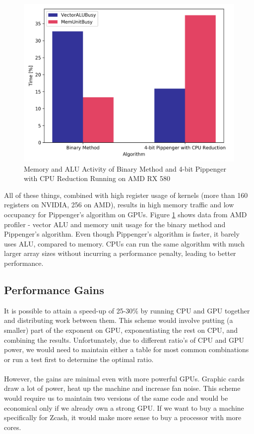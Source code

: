 \begin{figure}[h]
    \includegraphics[width=\linewidth]{Figures/profiler.png}
    \caption{Memory and ALU Activity of Binary Method and 4-bit Pippenger with CPU Reduction Running on AMD RX 580}
    \label{fig:profiler}
\end{figure}

\noindent All of these things, combined with high register usage of kernels (more than 160 registers on NVIDIA, 256 on AMD), results in high memory traffic and low occupancy for Pippenger's algorithm on GPUs. Figure \ref{fig:profiler} shows data from AMD profiler - vector ALU and memory unit usage for the binary method and Pippenger's algorithm. Even though Pippenger's algorithm is faster, it barely uses ALU, compared to memory. CPUs can run the same algorithm with much larger array sizes without incurring a performance penalty, leading to better performance.

\subsection{Performance Gains}

It is possible to attain a speed-up of 25-30\% by running CPU and GPU together and distributing work between them. This scheme would involve putting (a smaller) part of the exponent on GPU, exponentiating the rest on CPU, and combining the results. Unfortunately, due to different ratio's of CPU and GPU power, we would need to maintain either a table for most common combinations or run a test first to determine the optimal ratio.\\
\\
However, the gains are minimal even with more powerful GPUs. Graphic cards draw a lot of power, heat up the machine and increase fan noise. This scheme would require us to maintain two versions of the same code and would be economical only if we already own a strong GPU. If we want to buy a machine specifically for Zcash, it would make more sense to buy a processor with more cores.